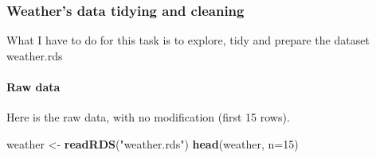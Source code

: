 \documentclass[
]{article}
\newenvironment{Shaded}{\begin{snugshade}}{\end{snugshade}}
\newcommand{\DataTypeTok}[1]{\textcolor[rgb]{0.13,0.29,0.53}{#1}}
\newcommand{\DecValTok}[1]{\textcolor[rgb]{0.00,0.00,0.81}{#1}}
\newcommand{\KeywordTok}[1]{\textcolor[rgb]{0.13,0.29,0.53}{\textbf{#1}}}
\newcommand{\NormalTok}[1]{#1}
\newcommand{\StringTok}[1]{\textcolor[rgb]{0.31,0.60,0.02}{#1}}
\begin{document}
\hypertarget{weathers-data-tidying-and-cleaning}{%
\subsubsection{Weather's data tidying and
cleaning}\label{weathers-data-tidying-and-cleaning}}

What I have to do for this task is to explore, tidy and prepare the
dataset weather.rds

\hypertarget{raw-data}{%
\paragraph{Raw data}\label{raw-data}}

Here is the raw data, with no modification (first 15 rows).

\begin{Shaded}
\begin{Highlighting}[]
\NormalTok{weather <-}\StringTok{ }\KeywordTok{readRDS}\NormalTok{(}\StringTok{"weather.rds"}\NormalTok{)}
\KeywordTok{head}\NormalTok{(weather, }\DataTypeTok{n=}\DecValTok{15}\NormalTok{)}
\end{Highlighting}
\end{Shaded}
\end{document}
